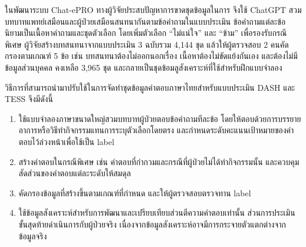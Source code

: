 ในพัฒนาระบบ Chat-ePRO \citep{Chen2024} ทางผู้วิจัยประสบปัญหาการขาดชุดข้อมูลในการ จึงใช้ ChatGPT สวมบทบาทแพทย์เสมือนและผู้ป่วยเสมือนสนทนากันตามข้อคำถามในแบบประเมิน ข้อคำถามแต่ละข้อนิยามเป็นเนื้อหาคำถามและชุดตัวเลือก โดยเพิ่มตัวเลือก ``ไม่แน่ใจ'' และ ``ข้าม'' เพื่อรองรับกรณีพิเศษ ผู้วิจัยสร้างบทสนทนาจากแบบประเมิน 3 ฉบับรวม 4,144 ชุด แล้วให้ผู้ตรวจสอบ 2 คนคัดกรองตามเกณฑ์ 5 ข้อ เช่น บทสนทนาต้องไม่ออกนอกเรื่อง เนื้อหาต้องไม่ขัดแย้งกันเอง และต้องไม่มีข้อมูลส่วนบุคคล คงเหลือ 3,965 ชุด และกลายเป็นชุดข้อมลูสังเคราะห์ที่ใช้สำหรับฝึกแบบจำลอง

วิธีการที่สามารถนำมาปรับใช้ในการจัดทำชุดข้อมูลคำตอบภาษาไทยสำหรับแบบประเมิน DASH และ TESS จึงมีดังนี้
\begin{enumerate}
    \item ใช้แบบจำลองภาษาขนาดใหญ่สวมบทบาทผู้ป่วยตอบข้อคำถามทีละข้อ โดยให้ตอบด้วยการบรรยายอาการหรือวิธีทำกิจกรรมแทนการระบุตัวเลือกโดยตรง และกำหนดระดับคะแนนเป้าหมายของคำตอบไว้ล่วงหน้าเพื่อใช้เป็น label
    \item สร้างคำตอบในกรณีพิเศษ เช่น คำตอบที่กำกวมและกรณีที่ผู้ป่วยไม่ได้ทำกิจกรรมนั้น และควบคุมสัดส่วนของคำตอบแต่ละระดับให้สมดุล
    \item คัดกรองข้อมูลที่สร้างขึ้นตามเกณฑ์ที่กำหนด และให้ผู้ตรวจสอบตรวจทาน label
    \item ใช้ข้อมูลสังเคราะห์สำหรับการพัฒนาและเปรียบเทียบส่วนตีความคำตอบเท่านั้น ส่วนการประเมินขั้นสุดท้ายดำเนินการกับผู้ป่วยจริง เนื่องจากข้อมูลสังเคราะห์อาจมีการกระจายตัวแตกต่างจากข้อมูลจริง
\end{enumerate}

